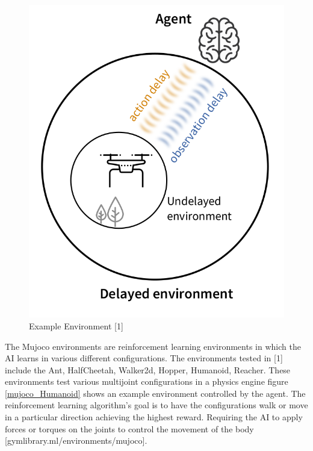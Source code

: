 \documentclass{article} %
\begin{document}
\begin{figure}[H]
\begin{center}
\includegraphics[scale=0.2]{images/fig1FromPaper}
\end{center}
\caption{Example Environment [1]}
\label{environmentImage}
\end{figure}

The Mujoco environments are reinforcement learning environments in which the AI learns in
various different configurations. 
The environments tested in [1] include the Ant, HalfCheetah, Walker2d, Hopper, Humanoid,
Reacher. 
These environments test various multijoint configurations in a physics engine figure \ref{mujoco_Humanoid} 
shows an example environment controlled by the agent.
The reinforcement learning algorithm's goal is to have the configurations walk or move in a 
particular direction achieving the highest reward. 
Requiring the AI to apply forces or torques on the joints to control the movement of the body 
[gymlibrary.ml/environments/mujoco].
\end{document}
